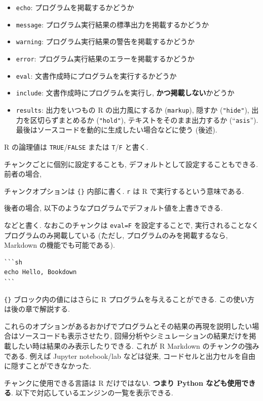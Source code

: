 \documentclass[
  nomag]{bxjsbook}
\providecommand{\tightlist}{%
  \setlength{\itemsep}{0pt}\setlength{\parskip}{0pt}}
\theoremstyle{definition}
\theoremstyle{definition}
\theoremstyle{definition}
\theoremstyle{remark}
\begin{document}
\begin{itemize}
\tightlist
\item
  \texttt{echo}: プログラムを掲載するかどうか
\item
  \texttt{message}: プログラム実行結果の標準出力を掲載するかどうか
\item
  \texttt{warning}: プログラム実行結果の警告を掲載するかどうか
\item
  \texttt{error}: プログラム実行結果のエラーを掲載するかどうか
\item
  \texttt{eval}: 文書作成時にプログラムを実行するかどうか
\item
  \texttt{include}: 文書作成時にプログラムを実行し,
  \textbf{かつ掲載しない}かどうか
\item
  \texttt{results}: 出力をいつもの R の出力風にするか (\texttt{markup}),
  隠すか (\texttt{"hide"}), 出力を区切らずまとめるか (\texttt{"hold"}),
  テキストをそのまま出力するか (``\texttt{asis}'').
  最後はソースコードを動的に生成したい場合などに使う (後述).
\end{itemize}

R の論理値は \texttt{TRUE}/\texttt{FALSE} または \texttt{T}/\texttt{F}
と書く.

チャンクごとに個別に設定することも,
デフォルトとして設定することもできる. 前者の場合,

チャンクオプションは \texttt{\{\}} 内部に書く. \texttt{r} は R
で実行するという意味である.

後者の場合, 以下のようなプログラムでデフォルト値を上書きできる.

などと書く. なおこのチャンクは \texttt{eval=F} を設定することで,
実行されることなくプログラムのみ掲載している (ただし,
プログラムのみを掲載するなら, Markdown の機能でも可能である).

\begin{verbatim}
```sh
echo Hello, Bookdown
```
\end{verbatim}

\texttt{\{\}} ブロック内の値にはさらに R プログラムを与えることができる.
この使い方は後の章で解説する.

これらのオプションがあるおかげでプログラムとその結果の再現を説明したい場合はソースコードも表示させたり,
回帰分析やシミュレーションの結果だけを掲載したい時は結果のみ表示したりできる.
これが R Markdown のチャンクの強みである. 例えば Jupyter notebook/lab
などは従来, コードセルと出力セルを自由に隠すことができなかった.

チャンクに使用できる言語は R だけではない. \textbf{つまり Python
なども使用できる}. 以下で対応しているエンジンの一覧を表示できる.
\end{document}
